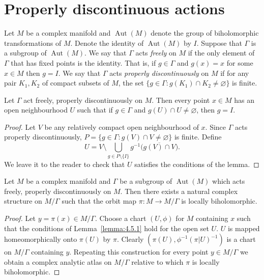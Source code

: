 \begin{enumerate}
\end{enumerate}

\section{Properly discontinuous actions}\label{sec:4:5}
Let $M$ be a complex manifold and $\operatorname{Aut}(M)$ denote the group of biholomorphic transformations of $M$. Denote the identity of $\operatorname{Aut}(M)$ by $I$. Suppose that $\Gamma$ is a subgroup of $\operatorname{Aut}(M)$. We say that $\Gamma$ acts \emph{freely} on $M$ if the only element of $\Gamma$ that has fixed points is the identity. That is, if $g\in\Gamma$ and $g(x)=x$ for some $x\in M$ then $g=I$. We say that $\Gamma$ acts \emph{properly discontinuously} on $M$ if for any pair $K_1,K_2$ of compact subsets of $M$, the set $\{g\in\Gamma:g(K_1)\cap K_2\neq\varnothing\}$ is finite.

 Let $\Gamma$ act freely, properly discontinuously on $M$. Then every point $x\in M$ has an open neighbourhood $U$ such that if $g\in\Gamma$ and $g(U)\cap U\neq\varnothing$, then $g=I$.
\begin{proof}
Let $V$ be any relatively compact open neighbourhood of $x$. Since $\Gamma$ acts properly discontinuously, $P=\{g\in\Gamma:g(V)\cap V\neq\varnothing\}$ is finite. Define
\[
U=V\setminus\bigcup_{g\in P\setminus\{I\}}g^{-1}\big(\overline{g(V)\cap V}\big).
\]
We leave it to the reader to check that $U$ satisfies the conditions of the lemma.
\end{proof}
 Let $M$ be a complex manifold and $\Gamma$ be a subgroup of $\operatorname{Aut}(M)$ which acts freely, properly discontinuously on $M$. Then there exists a natural complex structure on $M/\Gamma$ such that the orbit map $\pi:M\longrightarrow M/\Gamma$ is locally biholomorphic.
\begin{proof}
Let $y=\pi(x)\in M/\Gamma$. Choose a chart $(U,\phi)$ for $M$ containing $x$ such that the conditions of Lemma~\ref{lemma:4.5.1} hold for the open set $U$. $U$ is mapped homeomorphically onto $\pi(U)$ by $\pi$. Clearly $(\pi(U),\phi^{-1}(\pi|U)^{-1})$ is a chart on $M/\Gamma$ containing $y$. Repeating this construction for every point $y\in M/\Gamma$ we obtain a complex analytic atlas on $M/\Gamma$ relative to which $\pi$ is locally biholomorphic.
\end{proof}

